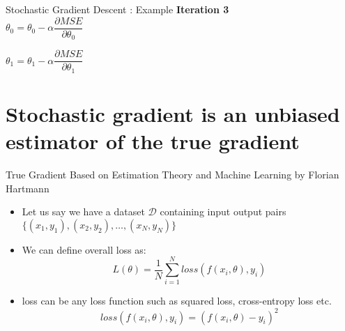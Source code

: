 \documentclass[usenames,dvipsnames]{beamer}
\begin{document}
                        \begin{frame}{Stochastic Gradient Descent : Example}
                        \textbf{Iteration 3}\\
                        \vspace{0.5cm}
                        $\theta_0 = \theta_0 - \alpha\dfrac{\partial MSE}{\partial \theta_0}$\\ 
                        \vspace{0.5cm}
                        
                        $\theta_1 = \theta_1 - \alpha\dfrac{\partial MSE}{\partial \theta_1}$\\ 
                        \vspace{0.5cm}
                        \end{frame}
                                       
                        
    \section{Stochastic gradient is an unbiased estimator of the true gradient}


    \begin{frame}{True Gradient}
        Based on Estimation Theory and Machine Learning by Florian Hartmann

        \begin{itemize}[<+->]
            \item Let us say we have a dataset $\mathcal{D}$ containing input output pairs $\{(x_1, y_1), (x_2, y_2), \ldots, (x_N, y_N)\}$
            \item We can define overall loss as:
                $$L(\theta) = \frac{1}{N}\sum_{i=1}^{N}loss(f(x_i, \theta), y_i)$$
            \item loss can be any loss function such as squared loss, cross-entropy loss etc.
            $$loss(f(x_i, \theta), y_i) = (f(x_i, \theta) - y_i)^2$$
        \end{itemize}
    \end{frame}
\end{document}
